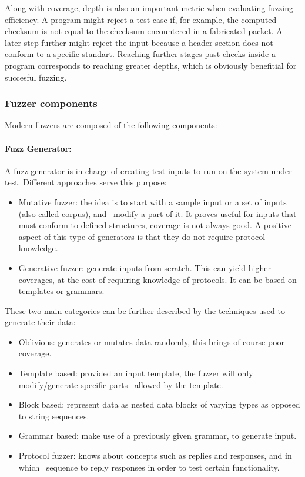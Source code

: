 Along with coverage, depth is also an important metric when evaluating fuzzing efficiency. A program
might reject a test case if, for example, the computed checksum is not equal to the checksum encountered
in a fabricated packet. A later step further might reject the input because a header section does not conform
to a specific standart. Reaching further stages past  checks inside a program corresponds to reaching greater
depths, which is obviously benefitial for succesful fuzzing.

\subsubsection{Fuzzer components}

Modern fuzzers are composed of the following components:

\paragraph{Fuzz Generator:}

A fuzz generator is in charge of creating test inputs to run on the system under test. Different
approaches serve this purpose\cite{mcnally12}:

\begin{itemize}
    \item Mutative fuzzer: the idea is to start with a sample input or a set of inputs (also called corpus), and \
    modify a part of it. It proves useful for inputs that must conform to defined structures, coverage is not
    always good. A positive aspect of this type of generators is that they do not require protocol knowledge.
    \item Generative fuzzer: generate inputs from scratch. This can yield higher coverages, at the cost of requiring
    knowledge of protocols. It can be based on templates or grammars.
\end{itemize}

These two main categories can be further described by the techniques used to generate their data:

\begin{itemize}
    \item Oblivious: generates or mutates data randomly, this brings of course poor coverage.
    \item Template based: provided an input template, the fuzzer will only modify/generate specific parts \
    allowed by the template.
    \item Block based: represent data as nested data blocks of varying types as opposed to string sequences.
    \item Grammar based: make use of a previously given grammar, to generate input.
    \item Protocol fuzzer: knows about concepts such as replies and responses, and in which \
    sequence to reply responses in order to test certain functionality.
\end{itemize}

